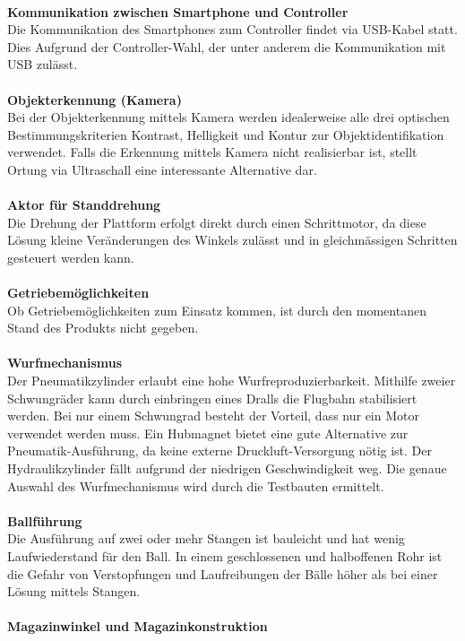 	\\
	\textbf{Kommunikation zwischen Smartphone und Controller}\\
	Die Kommunikation des Smartphones zum Controller findet via USB-Kabel statt. Dies Aufgrund der Controller-Wahl, der unter anderem die Kommunikation mit USB zulässt.\\
	\\
	\textbf{Objekterkennung (Kamera)}\\
	Bei der Objekterkennung mittels Kamera werden idealerweise alle drei optischen Bestimmungskriterien Kontrast, Helligkeit und Kontur zur Objektidentifikation verwendet. Falls die Erkennung mittels Kamera nicht realisierbar ist, stellt Ortung via Ultraschall eine interessante Alternative dar.\\
	\\
	\textbf{Aktor für Standdrehung}\\
	Die Drehung der Plattform erfolgt direkt durch einen Schrittmotor, da diese Lösung kleine Veränderungen des Winkels zulässt und in gleichmässigen Schritten gesteuert werden kann.\\
	\\
	\textbf{Getriebemöglichkeiten}\\
	Ob Getriebemöglichkeiten zum Einsatz kommen, ist durch den momentanen Stand des Produkts nicht gegeben.\\
	\\
	\textbf{Wurfmechanismus}\\
	Der Pneumatikzylinder erlaubt eine hohe Wurfreproduzierbarkeit. Mithilfe zweier Schwungräder kann durch einbringen eines Dralls die Flugbahn stabilisiert werden. Bei nur einem Schwungrad besteht der Vorteil, dass nur ein Motor verwendet werden muss. Ein Hubmagnet bietet eine gute Alternative zur Pneumatik-Ausführung, da keine externe Druckluft-Versorgung nötig ist. Der Hydraulikzylinder fällt aufgrund der niedrigen Geschwindigkeit weg. Die genaue Auswahl des Wurfmechanismus wird durch die Testbauten ermittelt.\\
	\\
	\textbf{Ballführung}\\
	Die Ausführung auf zwei oder mehr Stangen ist bauleicht und hat wenig Laufwiederstand für den Ball. In einem geschlossenen und halboffenen Rohr ist die Gefahr von Verstopfungen und Laufreibungen der Bälle höher als bei einer Lösung mittels Stangen.\\
	\\
	\textbf{Magazinwinkel und Magazinkonstruktion}\\
